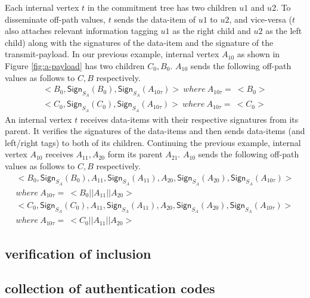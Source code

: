 		Each internal vertex $t$ in the commitment tree has two children $u1$ and $u2$. 
		To disseminate off-path values, $t$ sends the data-item of $u1$ to $u2$, and vice-versa ($t$ also attaches relevant information tagging $u1$ as the right child and $u2$ as the left child) along with the signatures of the data-item and the signature of the transmit-payload.
		In our previous example, internal vertex $A_{10}$ as shown in Figure \ref{fig:a-payload} has two children $C_{0},B_{0}$.
		$A_{10}$ sends the following off-path values as follows to $C, B$ respectively.
		\begin{equation}
			\begin{array}{l}
			<B_{0}, \textsf{Sign}_{S_{A}}(B_{0}),\textsf{Sign}_{S_{A}}(A_{10\tau})>\ where\ A_{10\tau} =\ <B_{0}>\\
			<C_{0}, \textsf{Sign}_{S_{A}}(C_{0}),\textsf{Sign}_{S_{A}}(A_{10\tau})>\ where\ A_{10\tau} =\ <C_{0}>
			\end{array}
		\end{equation}
		An internal vertex $t$ receives data-items with their respective signatures from its parent. 
		It verifies the signatures of the data-items and then sends data-items (and left/right tags) to both of its children.
		Continuing the previous example, internal vertex $A_{10}$ receives $A_{11}, A_{20}$ form its parent $A_{21}$.
		$A_{10}$ sends the following off-path values as follows to $C, B$ respectively.
		\begin{equation}
			\begin{array}{l}
			<B_{0}, \textsf{Sign}_{S_{A}}(B_{0}),A_{11},\textsf{Sign}_{S_{A}}(A_{11}),A_{20},\textsf{Sign}_{S_{A}}(A_{20}),\textsf{Sign}_{S_{A}}(A_{10\tau})>\\ 
				where\  A_{10\tau} =\ <B_{0}||A_{11}||A_{20}>\\
			<C_{0}, \textsf{Sign}_{S_{A}}(C_{0}),A_{11},\textsf{Sign}_{S_{A}}(A_{11}),A_{20},\textsf{Sign}_{S_{A}}(A_{20}),\textsf{Sign}_{S_{A}}(A_{10\tau})>\\ 
				where\  A_{10\tau} =\ <C_{0}||A_{11}||A_{20}>
			\end{array}
		\end{equation}

	\subsection{verification of inclusion}
	\subsection{collection of authentication codes}


